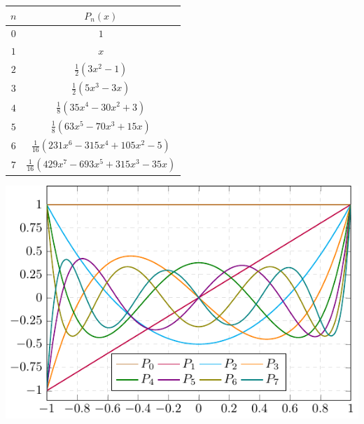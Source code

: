 \documentclass[../main.tex]{subfiles}
\begin{document}
\begin{center}
  \centering
  \begin{minipage}[ht]{0.47\textwidth}
    \centering
    \begin{tabular}{|c|c|}
      \hline
      $n$ & $P_n(x)$                                 \\
      \hline\hline
      $0$ & $1$                                      \\
      $1$ & $x$                                      \\
      $2$ & $\frac{1}{2}(3x^2-1)$                    \\
      $3$ & $\frac{1}{2}(5x^3-3x)$                   \\
      $4$ & $\frac{1}{8}(35x^4-30x^2+3)$             \\
      $5$ & $\frac{1}{8}(63x^5-70x^3+15x)$           \\
      $6$ & $\frac{1}{16}(231x^6-315x^4+105x^2-5)$   \\
      $7$ & $\frac{1}{16}(429x^7-693x^5+315x^3-35x)$ \\
      \hline
    \end{tabular}
    \label{tab:legendre_polys}
  \end{minipage}
  \hspace{0.02\textwidth}
  \begin{minipage}[ht]{0.47\textwidth}
    \centering
    \includegraphics[width=\textwidth]{Images/legendre.pdf}
  \end{minipage}
\end{center}
\end{document}
